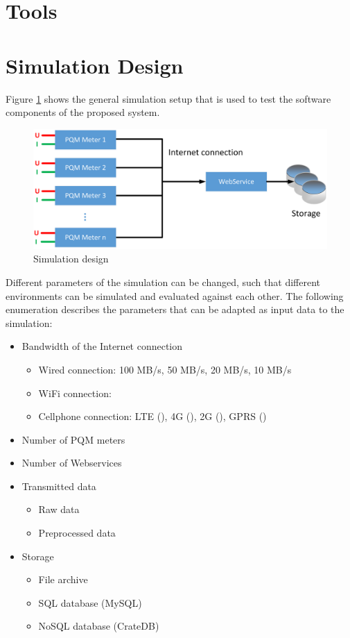 \section{Tools}

\section{Simulation Design}

Figure \ref{fig:simulation_design} shows the general simulation setup that is used to test the software components of the proposed system.

\begin{figure}[h]
	\centering
		\includegraphics[scale=0.4]{graphics/simulation.eps}
	\caption{Simulation design}
	\label{fig:simulation_design}
\end{figure}

Different parameters of the simulation can be changed, such that different environments can be simulated and evaluated against each other. The following enumeration describes the parameters that can be adapted as input data to the simulation:

\begin{itemize}
	\item Bandwidth of the Internet connection
		\begin{itemize}
			\item Wired connection: 100 MB/s, 50 MB/s, 20 MB/s, 10 MB/s
			\item WiFi connection: 
			\item Cellphone connection: LTE (), 4G (), 2G (), GPRS ()
		\end{itemize}
	\item Number of PQM meters
	\item Number of Webservices
	\item Transmitted data
		\begin{itemize}
			\item Raw data
			\item Preprocessed data
		\end{itemize}
  \item Storage
		\begin{itemize}
			\item File archive
			\item SQL database (MySQL)
			\item NoSQL database (CrateDB)
		\end{itemize}		
\end{itemize}

